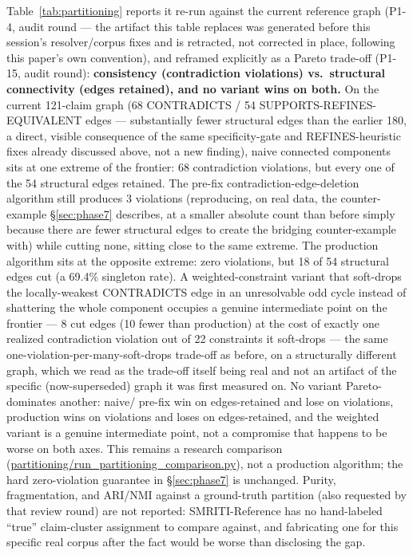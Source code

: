 Table~\ref{tab:partitioning} reports it re-run against the current
reference graph (P1-4, audit round --- the artifact this table replaces
was generated before this session's resolver/corpus fixes and is
retracted, not corrected in place, following this paper's own
convention), and reframed explicitly as a Pareto trade-off (P1-15,
audit round): \textbf{consistency (contradiction violations) vs.\
structural connectivity (edges retained), and no variant wins on both.}
On the current 121-claim graph (68 CONTRADICTS / 54
SUPPORTS-REFINES-EQUIVALENT edges --- substantially fewer structural
edges than the earlier 180, a direct, visible consequence of the
same specificity-gate and REFINES-heuristic fixes already discussed
above, not a new finding), naive connected components sits at one
extreme of the frontier: 68 contradiction violations, but every one of
the 54 structural edges retained. The pre-fix contradiction-edge-deletion
algorithm still produces 3 violations (reproducing, on real data, the
counter-example \S\ref{sec:phase7} describes, at a smaller absolute
count than before simply because there are fewer structural edges to
create the bridging counter-example with) while cutting none, sitting
close to the same extreme. The production algorithm sits at the
opposite extreme: zero violations, but 18 of 54 structural edges cut (a
69.4\% singleton rate). A weighted-constraint variant that soft-drops
the locally-weakest CONTRADICTS edge in an unresolvable odd cycle
instead of shattering the whole component occupies a genuine
intermediate point on the frontier --- 8 cut edges (10 fewer than
production) at the cost of exactly one realized contradiction violation
out of 22 constraints it soft-drops --- the same
one-violation-per-many-soft-drops trade-off as before, on a
structurally different graph, which we read as the trade-off itself
being real and not an artifact of the specific (now-superseded) graph it
was first measured on. No variant Pareto-dominates another: naive/
pre-fix win on edges-retained and lose on violations, production wins
on violations and loses on edges-retained, and the weighted variant is
a genuine intermediate point, not a compromise that happens to be worse
on both axes. This remains a research comparison
(\url{partitioning/run_partitioning_comparison.py}), not a
production algorithm; the hard zero-violation guarantee in
\S\ref{sec:phase7} is unchanged. Purity, fragmentation, and ARI/NMI
against a ground-truth partition (also requested by that review round)
are not reported: SMRITI-Reference has no hand-labeled ``true'' claim-cluster
assignment to compare against, and fabricating one for this specific
real corpus after the fact would be worse than disclosing the gap.

